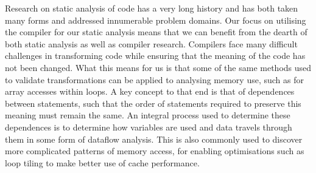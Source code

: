 
Research on static analysis of code has a very long history and has both taken many forms and addressed innumerable problem domains\cite{Andrade:2012:SAW:2355585.2355593}\cite{1194988}.
Our focus on utilising the compiler for our static analysis means that we can benefit from the dearth of both static analysis as well as compiler research.
Compilers face many difficult challenges in transforming code while ensuring that the meaning of the code has not been changed.
What this means for us is that some of the same methods used to validate transformations can be applied to analysing memory use, such as for array accesses within loops.
A key concept to that end is that of dependences between statements, such that the order of statements required to preserve this meaning must remain the same.
An integral process used to determine these dependences is to determine how variables are used and data travels through them in some form of dataflow analysis\cite{Feautrier1991}.
This is also commonly used to discover more complicated patterns of memory access, for enabling optimisations such as loop tiling to make better use of cache performance.

